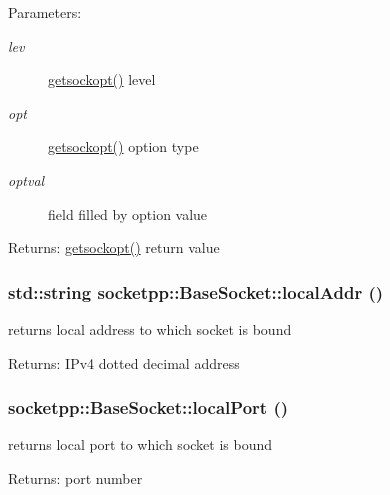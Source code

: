 \begin{CompactItemize}
\begin{Desc}
\item[Parameters:]
\begin{description}
\item[{\em lev}]\hyperlink{classsocketpp_1_1BaseSocket_c845c3a037f0f400fd50dfb58706b6e4}{getsockopt()} level \item[{\em opt}]\hyperlink{classsocketpp_1_1BaseSocket_c845c3a037f0f400fd50dfb58706b6e4}{getsockopt()} option type \item[{\em optval}]field filled by option value \end{description}
\end{Desc}
\begin{Desc}
\item[Returns:]\hyperlink{classsocketpp_1_1BaseSocket_c845c3a037f0f400fd50dfb58706b6e4}{getsockopt()} return value \end{Desc}
\hypertarget{classsocketpp_1_1BaseSocket_0caed2e7d3f0e4db7d4c1aa3aba52caf}{
\subsubsection[{localAddr}]{\setlength{\rightskip}{0pt plus 5cm}std::string socketpp::BaseSocket::localAddr ()}}
\label{classsocketpp_1_1BaseSocket_0caed2e7d3f0e4db7d4c1aa3aba52caf}


returns local address to which socket is bound 

\begin{Desc}
\item[Returns:]IPv4 dotted decimal address \end{Desc}
\hypertarget{classsocketpp_1_1BaseSocket_d4a2c0e4932436ef61f911514385d16c}{
\subsubsection[{localPort}]{ socketpp::BaseSocket::localPort ()}}
\label{classsocketpp_1_1BaseSocket_d4a2c0e4932436ef61f911514385d16c}


returns local port to which socket is bound 

\begin{Desc}
\item[Returns:]port number \end{Desc}
\hypertarget{classsocketpp_1_1BaseSocket_2060dc1b648f83f8bf5ae3d9ecfcd619}{
}
\end{CompactItemize}
